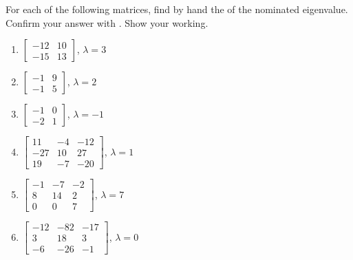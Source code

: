 \begin{exercise} \label{ex:} 
For each of the following matrices, find by hand the  of the nominated eigenvalue.  
Confirm your answer with \script.  
Show your working.  
\begin{enumerate}
\item \(\begin{bmatrix} -12 & 10
\\-15 & 13 \end{bmatrix}\), \(\lambda=3\)

\item \(\begin{bmatrix} -1 & 9
\\-1 & 5 \end{bmatrix}\), \(\lambda=2\)

\item \(\begin{bmatrix} -1 & 0
\\-2 & 1 \end{bmatrix}\), \(\lambda=-1\)

\item \(\begin{bmatrix} 11 & -4 & -12
\\-27 & 10 & 27
\\19 & -7 & -20 \end{bmatrix}\), \(\lambda=1\)

\item \(\begin{bmatrix} -1 & -7 & -2
\\8 & 14 & 2
\\0 & 0 & 7 \end{bmatrix}\), \(\lambda=7\)

\item \(\begin{bmatrix} -12 & -82 & -17
\\3 & 18 & 3
\\-6 & -26 & -1 \end{bmatrix}\), \(\lambda=0\)


\end{enumerate}
\end{exercise}
